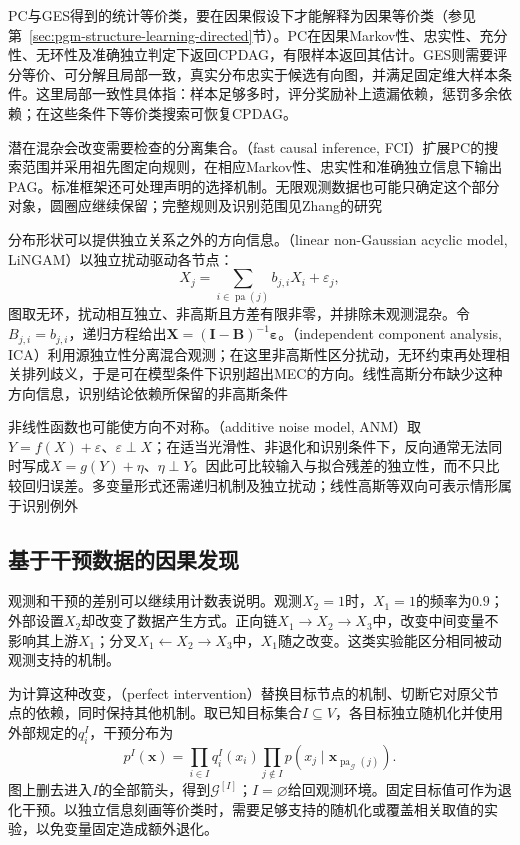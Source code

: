 PC与GES得到的统计等价类，要在因果假设下才能解释为因果等价类（参见第~\ref{sec:pgm-structure-learning-directed}节）。PC在因果Markov性、忠实性、充分性、无环性及准确独立判定下返回CPDAG，有限样本返回其估计。GES则需要评分等价、可分解且局部一致，真实分布忠实于候选有向图，并满足固定维大样本条件。这里局部一致性具体指：样本足够多时，评分奖励补上遗漏依赖，惩罚多余依赖；在这些条件下等价类搜索可恢复CPDAG。

潜在混杂会改变需要检查的分离集合。（fast causal inference, FCI）扩展PC的搜索范围并采用祖先图定向规则，在相应Markov性、忠实性和准确独立信息下输出PAG。标准框架还可处理声明的选择机制。无限观测数据也可能只确定这个部分对象，圆圈应继续保留；完整规则及识别范围见Zhang的研究

分布形状可以提供独立关系之外的方向信息。（linear non-Gaussian acyclic model, LiNGAM）以独立扰动驱动各节点：
\[
  X_j=\sum_{i\in\operatorname{pa}(j)}b_{j,i}X_i+\varepsilon_j,
\]
图取无环，扰动相互独立、非高斯且方差有限非零，并排除未观测混杂。令$B_{j,i}=b_{j,i}$，递归方程给出$\bm{X}=(\bm{I}-\bm{B})^{-1}\bm{\varepsilon}$。（independent component analysis, ICA）利用源独立性分离混合观测；在这里非高斯性区分扰动，无环约束再处理相关排列歧义，于是可在模型条件下识别超出MEC的方向。线性高斯分布缺少这种方向信息，识别结论依赖所保留的非高斯条件

非线性函数也可能使方向不对称。（additive noise model, ANM）取$Y=f(X)+\varepsilon$、$\varepsilon\perp X$；在适当光滑性、非退化和识别条件下，反向通常无法同时写成$X=g(Y)+\eta$、$\eta\perp Y$。因此可比较输入与拟合残差的独立性，而不只比较回归误差。多变量形式还需递归机制及独立扰动；线性高斯等双向可表示情形属于识别例外

\subsection{基于干预数据的因果发现}
\label{sec:pgm-structure-learning-interventional}

观测和干预的差别可以继续用计数表说明。观测$X_2=1$时，$X_1=1$的频率为$0.9$；外部设置$X_2$却改变了数据产生方式。正向链$X_1\to X_2\to X_3$中，改变中间变量不影响其上游$X_1$；分叉$X_1\leftarrow X_2\to X_3$中，$X_1$随之改变。这类实验能区分相同被动观测支持的机制。

为计算这种改变，（perfect intervention）替换目标节点的机制、切断它对原父节点的依赖，同时保持其他机制。取已知目标集合$I\subseteq V$，各目标独立随机化并使用外部规定的$q_i^I$，干预分布为
\begin{equation}
  p^I(\bm{x})
  =\prod_{i\in I}q_i^I(x_i)
   \prod_{j\notin I}
      p(x_j\mid\bm{x}_{\operatorname{pa}_{\mathcal{G}}(j)}).
  \label{eq:pgm-structure-learning-intervention}
\end{equation}
图上删去进入$I$的全部箭头，得到$\mathcal{G}^{[I]}$；$I=\varnothing$给回观测环境。固定目标值可作为退化干预。以独立信息刻画等价类时，需要足够支持的随机化或覆盖相关取值的实验，以免变量固定造成额外退化。

